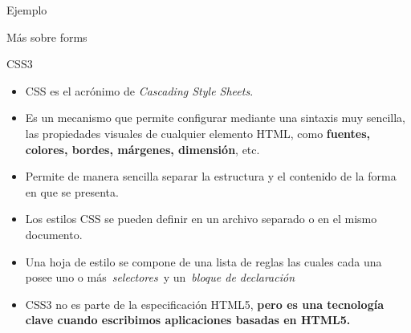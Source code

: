 \documentclass[aspectratio=43,10pt,t]{beamer}
\begin{document}
\begin{frame}{Ejemplo}\relax
{}
\end{frame}

\begin{frame}{Más sobre forms}\relax
{}
\end{frame}

\begin{utnfondo}
\end{utnfondo}

\begin{frame}{CSS3}\relax
\begingroup
{}
\begin{itemize}
  \item\relax CSS es el acrónimo de \textit{Cascading Style Sheets}.
  \item\relax Es un mecanismo que permite configurar mediante una sintaxis muy sencilla, las propiedades visuales de cualquier elemento HTML, como \textbf{fuentes, colores, bordes, márgenes, dimensión}, etc.
  \item\relax Permite de manera sencilla separar la estructura y el contenido de la forma en que se presenta.
  \item\relax Los estilos CSS se pueden definir en un archivo separado o en el mismo documento.
  \item\relax Una hoja de estilo se compone de una lista de reglas las cuales cada una posee uno o más~\textit{selectores}~y un~\textit{bloque de declaración}
  \item\relax CSS3 no es parte de la especificación HTML5, \textbf{pero es una tecnología clave cuando escribimos aplicaciones basadas en HTML5.}
\end{itemize}
\endgroup
\end{frame}
\end{document}
